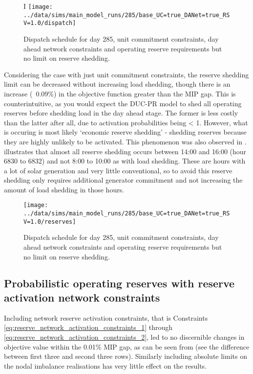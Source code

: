 \documentclass[number,times]{elsarticle}
\begin{document}

\begin{figure}[H]I
    \centering
    \texttt{[image: ../data/sims/main\_model\_runs/285/base\_UC=true\_DANet=true\_RSV=1.0/dispatch]}
    \caption{Dispatch schedule for day 285, unit commitment constraints, day ahead network constraints and operating reserve requirements but no limit on reserve shedding.\label{fig:dispatch_with_operating_reserves}}
\end{figure}

Considering the case with just unit commitment constraints, the reserve shedding limit can be decreased without increasing load shedding, though there is an increase (~0.09\%) in the objective function greater than the MIP gap. This is counterintuitive, as you would expect the DUC-PR model to shed all operating reserves before shedding load in the day ahead stage. The former is less costly than the latter after all, due to activation probabilities being < 1. However, what is occuring is most likely `economic reserve shedding' - shedding reserves because they are highly unlikely to be activated. This phenomenon was also observed in \cite{Hermans2018}.  illustrates that almost all reserve shedding occurs between 14:00 and 16:00 (hour 6830 to 6832) and not 8:00 to 10:00 as with load shedding. These are hours with a lot of solar generation and very little conventional, so to avoid this reserve shedding only requires additional generator commitment and not increasing the amount of load shedding in those hours.

\begin{figure}[H]
    \centering
    \texttt{[image: ../data/sims/main\_model\_runs/285/base\_UC=true\_DANet=true\_RSV=1.0/reserves]}
    \caption{Dispatch schedule for day 285, unit commitment constraints, day ahead network constraints and operating reserve requirements but no limit on reserve shedding.\label{fig:reserves_with_operating_reserves}}
\end{figure}

\subsection{Probabilistic operating reserves with reserve activation network constraints}

Including network reserve activation constraints, that is Constraints \ref{eq:reserve_network_activation_constraints_1} through \ref{eq:reserve_network_activation_constraints_2}, led to no discernible changes in objective value within the 0.01\% MIP gap, as can be seen from  (see the difference between first three and second three rows). Similarly including absolute limits on the nodal imbalance realisations has very little effect on the results.
\end{document}
